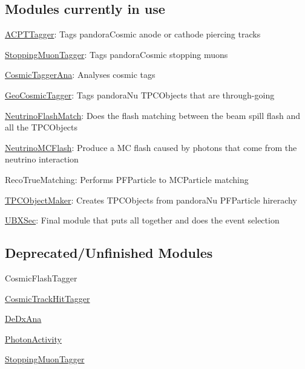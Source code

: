 \subsection*{Modules currently in use}


\begin{DoxyItemize}
\item \hyperlink{classACPTTagger}{A\-C\-P\-T\-Tagger}\-: Tags pandora\-Cosmic anode or cathode piercing tracks
\item \hyperlink{classStoppingMuonTagger}{Stopping\-Muon\-Tagger}\-: Tags pandora\-Cosmic stopping muons
\item \hyperlink{classCosmicTaggerAna}{Cosmic\-Tagger\-Ana}\-: Analyses cosmic tags
\item \hyperlink{classGeoCosmicTagger}{Geo\-Cosmic\-Tagger}\-: Tags pandora\-Nu T\-P\-C\-Objects that are through-\/going
\item \hyperlink{classNeutrinoFlashMatch}{Neutrino\-Flash\-Match}\-: Does the flash matching between the beam spill flash and all the T\-P\-C\-Objects
\item \hyperlink{classNeutrinoMCFlash}{Neutrino\-M\-C\-Flash}\-: Produce a M\-C flash caused by photons that come from the neutrino interaction
\item Reco\-True\-Matching\-: Performs P\-F\-Particle to M\-C\-Particle matching
\item \hyperlink{classTPCObjectMaker}{T\-P\-C\-Object\-Maker}\-: Creates T\-P\-C\-Objects from pandora\-Nu P\-F\-Particle hirerachy
\item \hyperlink{classUBXSec}{U\-B\-X\-Sec}\-: Final module that puts all together and does the event selection
\end{DoxyItemize}

\subsection*{Deprecated/\-Unfinished Modules}


\begin{DoxyItemize}
\item Cosmic\-Flash\-Tagger
\item \hyperlink{classCosmicTrackHitTagger}{Cosmic\-Track\-Hit\-Tagger}
\item \hyperlink{classDeDxAna}{De\-Dx\-Ana}
\item \hyperlink{classPhotonActivity}{Photon\-Activity}
\item \hyperlink{classStoppingMuonTagger}{Stopping\-Muon\-Tagger} 
\end{DoxyItemize}